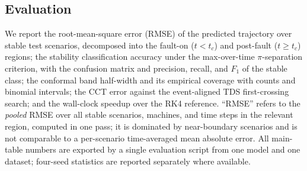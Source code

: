 \documentclass[5p,times]{elsarticle}
\begin{document}
\subsection{Evaluation}
We report the root-mean-square error (RMSE) of the predicted trajectory over stable test
scenarios, decomposed into the fault-on ($t<t_c$) and post-fault ($t\ge t_c$) regions; the
stability classification accuracy under the max-over-time $\pi$-separation criterion, with the
confusion matrix and precision, recall, and $F_1$ of the stable class; the conformal band
half-width and its empirical coverage with counts and binomial intervals; the CCT error against
the event-aligned TDS first-crossing search; and the wall-clock speedup over the RK4 reference. ``RMSE''
refers to the \emph{pooled} RMSE over all stable scenarios, machines, and time steps in the
relevant region, computed in one pass; it is dominated by near-boundary scenarios and is not
comparable to a per-scenario time-averaged mean absolute error. All main-table numbers are
exported by a single evaluation script from one model and one dataset; four-seed statistics are
reported separately where available.
\end{document}
